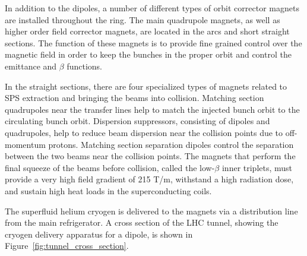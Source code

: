 \documentclass[dissertation.tex]{subfiles}
\begin{document}
In addition to the dipoles, a number of different types of orbit corrector magnets are installed throughout the ring.  The main quadrupole magnets, as well as higher order field corrector magnets, are located in the arcs and short straight sections.  The function of these magnets is to provide fine grained control over the magnetic field in order to keep the bunches in the proper orbit and control the emittance and $\beta$ functions.

In the straight sections, there are four specialized types of magnets related to SPS extraction and bringing the beams into collision.  Matching section quadrupoles near the transfer lines help to match the injected bunch orbit to the circulating bunch orbit.  Dispersion suppressors, consisting of dipoles and quadrupoles, help to reduce beam dispersion near the collision points due to off-momentum protons.  Matching section separation dipoles control the separation between the two beams near the collision points.  The magnets that perform the final squeeze of the beams before collision, called the low-$\beta$ inner triplets, must provide a very high field gradient of 215 T/m, withstand a high radiation dose, and sustain high heat loads in the superconducting coils.

The superfluid helium cryogen is delivered to the magnets via a distribution line from the main refrigerator.  A cross section of the LHC tunnel, showing the cryogen delivery apparatus for a dipole, is shown in Figure~\ref{fig:tunnel_cross_section}.
\end{document}
